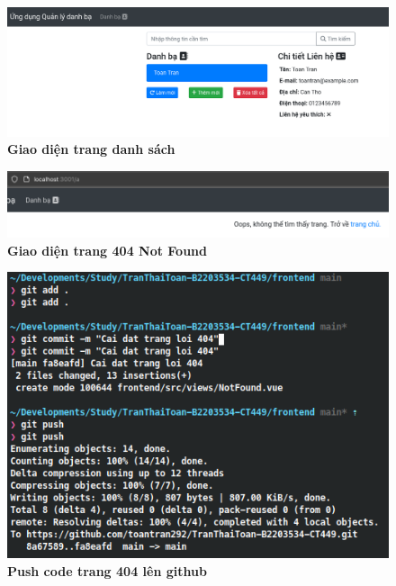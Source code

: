 {}
\setcounter{subsection}{3}
\setcounter{figure}{0}
\begin{figure}[H]
    \centering
    \includegraphics[width=15cm]{imgs/3.png}
    \caption{\bfseries Giao diện trang danh sách}
\end{figure}
{}
\setcounter{subsection}{4}
\setcounter{figure}{0}
\begin{figure}[H]
    \centering
    \includegraphics[width=15cm]{imgs/5.png}
    \caption{\bfseries Giao diện trang 404 Not Found}
\end{figure}
\begin{figure}[H]
    \centering
    \includegraphics{imgs/6.png}
    \caption{\bfseries Push code trang 404 lên github}
\end{figure}
